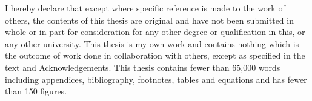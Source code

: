 
\begin{declaration}

I hereby declare that except where specific reference is made to the work of 
others, the contents of this thesis are original and have not been 
submitted in whole or in part for consideration for any other degree or 
qualification in this, or any other university. This thesis is my own 
work and contains nothing which is the outcome of work done in collaboration 
with others, except as specified in the text and Acknowledgements. This 
thesis contains fewer than 65,000 words including appendices, 
bibliography, footnotes, tables and equations and has fewer than 150 figures.


\end{declaration}

